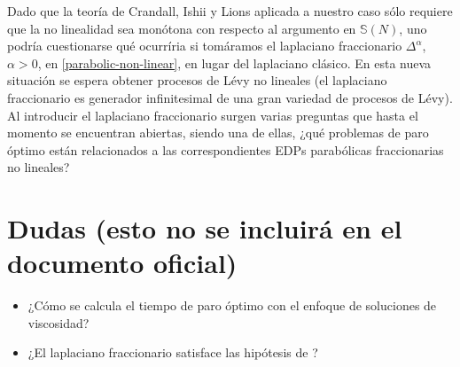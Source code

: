 \documentclass{article}
\numberwithin{equation}{section}
\begin{document}
Dado que la teoría de Crandall, Ishii y Lions aplicada a nuestro caso sólo requiere que la no linealidad sea monótona con respecto al argumento en $\mathbb{S}(N)$, uno podría cuestionarse qué ocurríria si tomáramos el laplaciano fraccionario $\Delta^\alpha$, $\alpha>0$, en  \eqref{parabolic-non-linear}, en lugar del laplaciano clásico. En esta nueva situación se espera obtener procesos de Lévy no lineales (el laplaciano fraccionario es generador infinitesimal de una gran variedad de procesos de Lévy). Al introducir el laplaciano fraccionario surgen varias preguntas que hasta el momento se encuentran abiertas, siendo una de ellas, ¿qué problemas de paro óptimo están relacionados a las correspondientes EDPs parabólicas fraccionarias no lineales?




\section{Dudas (esto no se incluirá en el documento oficial)}
\begin{itemize}
    \item ¿Cómo se calcula el tiempo de paro óptimo con el enfoque de soluciones de viscosidad?
    \item ¿El laplaciano fraccionario satisface las hipótesis de \cite{crandall1992users}?
\end{itemize}






 
\end{document}
